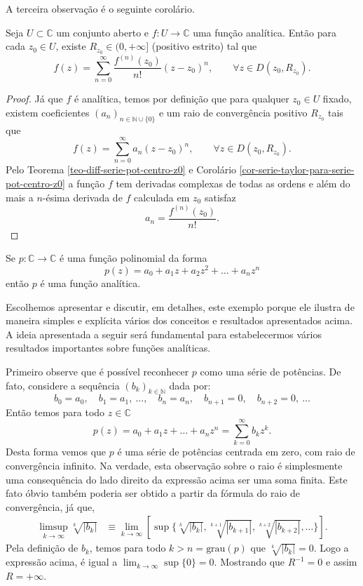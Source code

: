 \bigskip

A terceira observação é o seguinte corolário.

\begin{corolario}\label{cor-coeficientes-func-analiticas}
Seja $U\subset\mathbb{C}$ um conjunto aberto e $f:U\to\mathbb{C}$
uma função analítica. Então para cada $z_0\in U$, existe 
$R_{z_0}\in (0,+\infty]$ (positivo estrito) tal que 
\[
f(z) = \sum_{n=0}^{\infty} \frac{f^{(n)}(z_0)}{n!}(z-z_0)^n,
\qquad \forall z\in D(z_0,R_{z_0}).
\]
\end{corolario}

\begin{proof}
Já que $f$ é analítica, temos por definição que para qualquer $z_0\in U$ 
fixado, existem coeficientes $(a_n)_{n\in\mathbb{N}\cup\{0\}}$ e um 
raio de convergência positivo $R_{z_0}$ tais que 
\[
f(z) = \sum_{n=0}^{\infty} a_n(z-z_0)^n,
\qquad \forall z\in D(z_0,R_{z_0}).
\]
Pelo Teorema \ref{teo-diff-serie-pot-centro-z0} e Corolário \ref{cor-serie-taylor-para-serie-pot-centro-z0} a função $f$ 
tem derivadas complexas de todas as ordens e além do mais 
a $n$-ésima derivada de $f$ calculada em $z_0$ satisfaz
\[
a_n = \frac{f^{(n)}(z_0)}{n!}.
\]
\end{proof}



\begin{exemplo}\label{exe-pol-serie-pot}
Se $p:\mathbb{C}\to\mathbb{C}$ é uma função polinomial da forma 
\[
p(z) = a_0+a_1z+a_2z^2+\ldots +a_nz^{n}
\]
então $p$ é uma função analítica.
\end{exemplo}

Escolhemos apresentar e discutir, em detalhes, este exemplo porque
ele ilustra de maneira simples e explícita vários dos conceitos 
e resultados apresentados acima. A ideia apresentada a seguir será fundamental
para estabelecermos vários resultados importantes sobre funções
analíticas. 

\medskip 

Primeiro observe que é possível reconhecer $p$ como 
uma série de potências. 
De fato, considere a sequência $(b_k)_{k\in\mathbb{N}}$
dada por:
\[
b_0=a_0,\quad b_1=a_1,\ \ldots,\quad b_n=a_n,\quad  b_{n+1}=0,\quad b_{n+2}=0,\ \ldots
\]
Então temos para todo $z\in \mathbb{C}$
\[
p(z) = a_0+a_1z+\ldots+a_nz^n = \sum_{k=0}^{\infty} b_kz^k.
\]
Desta forma vemos que $p$ é uma série de potências centrada em zero, com
raio de convergência infinito. Na verdade, esta observação sobre o raio é simplesmente 
uma consequência do lado direito da expressão acima ser uma soma
finita. Este fato óbvio também poderia ser obtido a partir da fórmula 
do raio de convergência, já que, 
\begin{align*}
\limsup_{k\to\infty} \sqrt[k]{|b_k|}
&\equiv 
\lim_{k\to\infty} \left[ \sup \Big\{ \sqrt[k]{|b_k|}, \sqrt[k+1]{|b_{k+1}|}, \sqrt[k+2]{|b_{k+2}|},\ldots  \Big\} \right].
\end{align*}
Pela definição de $b_k$, temos para todo $k>n =\textrm{grau}(p)$ que 
$\sqrt[k]{|b_k|}=0$. Logo a expressão acima, 
é igual a $\lim_{k\to\infty} \sup\{0\} = 0$. Mostrando que
$R^{-1}=0$ e assim $R=+\infty$.  

